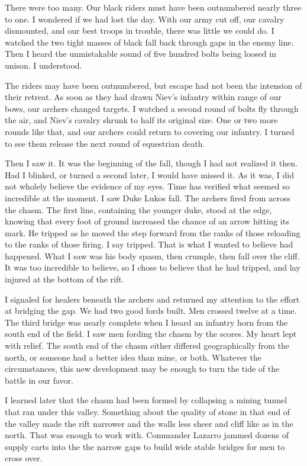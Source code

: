 \documentclass{article}
\begin{document}
There were too many. Our black riders must have been outnumbered nearly three to one. I wondered if we had lost the day. With our army cut off, our cavalry dismounted, and our best troops in trouble, there was little we could do. I watched the two tight masses of black fall back through gaps in the enemy line. Then I heard the unmistakable sound of five hundred bolts being loosed in unison. I understood.

The riders may have been outnumbered, but escape had not been the intension of their retreat. As soon as they had drawn Niev's infantry within range of our bows, our archers changed targets. I watched a second round of bolts fly through the air, and Niev's cavalry shrunk to half its original size. One or two more rounds like that, and our archers could return to covering our infantry. I turned to see them release the next round of equestrian death.

Then I saw it. It was the beginning of the fall, though I had not realized it then. Had I blinked, or turned a second later, I would have missed it. As it was, I did not wholely believe the evidence of my eyes. Time has verified what seemed so incredible at the moment. I saw Duke Lukos fall. The archers fired from across the chasm. The first line, containing the younger duke, stood at the edge, knowing that every foot of ground increased the chance of an arrow hitting its mark. He tripped as he moved the step forward from the ranks of those reloading to the ranks of those firing. I say tripped. That is what I wanted to believe had happened. What I saw was his body spasm, then crumple, then fall over the cliff. It was too incredible to believe, so I chose to believe that he had tripped, and lay injured at the bottom of the rift.

I signaled for healers beneath the archers and returned my attention to the effort at bridging the gap.  We had two good fords built. Men crossed twelve at a time. The third bridge was nearly complete when I heard an infantry horn from the south end of the field. I saw men fording the chasm by the scores. My heart lept with relief. The south end of the chasm either differed geographically from the north, or someone had a better idea than mine, or both. Whatever the circumstances, this new development may be enough to turn the tide of the battle in our favor. 

I learned later that the chasm had been formed by collapsing a mining tunnel that ran under this valley. Something about the quality of stone in that end of the valley made the rift narrower and the walls less sheer and cliff like as in the north. That was enough to work with. Commander Lazarro jammed dozens of supply carts into the the narrow gaps to build wide stable bridges for men to cross over. 
\end{document}
